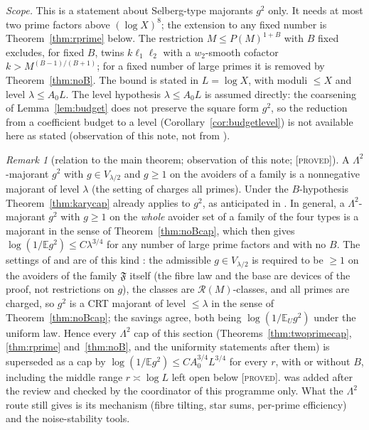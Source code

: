 \documentclass[10pt,reqno]{amsart}
\theoremstyle{definition}
\theoremstyle{remark}
\newtheorem{remark}[theorem]{Remark}
\newcommand{\cR}{\mathscr R}
\newcommand{\cF}{\mathfrak F}
\newcommand{\E}{\mathbb E}
\newcommand{\lab}[1]{\textup{[\textsc{#1}]}}
\begin{document}
\emph{Scope.}  This is a statement about Selberg-type majorants $g^2$
only.  It needs at most two prime factors above $(\log X)^8$; the
extension to any fixed number is Theorem~\ref{thm:rprime} below.  The
restriction $M\leq P(M)^{1+B}$ with $B$ fixed excludes, for fixed $B$,
twins $k\ell_1\ell_2$ with a $w_2$-smooth cofactor $k>M^{(B-1)/(B+1)}$; for
a fixed number of large primes it is removed by Theorem~\ref{thm:noB}.
The bound is stated in $L=\log X$, with moduli $\leq X$ and level
$\lambda\leq A_0L$.  The level hypothesis $\lambda\leq A_0L$ is assumed
directly: the coarsening of Lemma~\ref{lem:budget} does not preserve the
square form $g^2$, so the reduction from a coefficient budget to a level
(Corollary~\ref{cor:budgetlevel}) is not available here as stated
(observation of this note, not from \cite{TW2,TW3}).

\begin{remark}[relation to the main theorem; observation of this note; \lab{proved}]\label{rem:L2vsmain}
A $\Lambda^2$-majorant $g^2$ with $g\in V_{\lambda/2}$ and $g\geq1$ on the
avoiders of a family is a nonnegative majorant of level $\lambda$ (the
setting of \cite[\S3]{TW2} charges all primes).  Under the $B$-hypothesis
Theorem~\ref{thm:karycap} already applies to $g^2$, as anticipated in
\cite[\S11]{TW4}.  In general, a $\Lambda^2$-majorant $g^2$ with $g\geq1$ on the \emph{whole}
avoider set of a family of the four types is a majorant in the sense of
Theorem~\ref{thm:noBcap}, which then gives $\log(1/\E g^2)\leq C\lambda^{3/4}$
for any number of large prime factors and with no $B$.  The settings of
\cite[\S3]{TW2} and \cite{TW4} are of this kind \cite[Lemma~7.1]{KA3}: the
admissible $g\in V_{\lambda/2}$ is required to be $\geq1$ on the avoiders of the
family $\cF$ itself (the fibre law and the base are devices of the proof,
not restrictions on $g$), the classes are $\cR(M)$-classes, and all primes
are charged, so $g^2$ is a CRT majorant of level $\leq\lambda$ in the sense of
Theorem~\ref{thm:noBcap}; the savings agree, both being
$\log(1/\E_Ug^2)$ under the uniform law.  Hence every $\Lambda^2$ cap of
this section (Theorems~\ref{thm:twoprimecap}, \ref{thm:rprime}
and~\ref{thm:noB}, and the uniformity statements after them) is superseded
as a cap by $\log(1/\E g^2)\leq CA_0^{3/4}L^{3/4}$ for every $r$, with or without
$B$, including the middle range $r\asymp\log L$ left open below
\lab{proved}.  \cite[Lemma~7.1]{KA3} was added after the review
\cite{KA3rev} and checked by the coordinator of this programme only.
What the $\Lambda^2$ route still gives is its mechanism (fibre tilting,
star sums, per-prime efficiency) and the noise-stability tools.
\end{remark}
\end{document}
